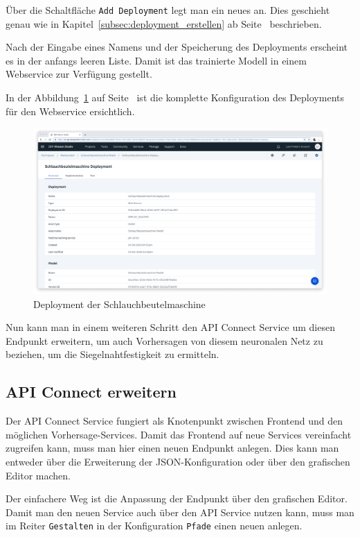 Über die Schaltfläche \texttt{Add Deployment} legt man ein neues an. Dies geschieht genau wie in
Kapitel~\ref{subsec:deployment_erstellen} ab Seite~\pageref{subsec:deployment_erstellen} beschrieben.

Nach der Eingabe eines Namens und der Speicherung des Deployments erscheint es in der anfangs leeren Liste. Damit ist
das trainierte Modell in einem Webservice zur Verfügung gestellt.

In der Abbildung~\ref{fig:siegelmaschinen_deployment} auf Seite~\pageref{fig:siegelmaschinen_deployment} ist die
komplette Konfiguration des Deployments für den Webservice ersichtlich.

\begin{figure}[h]
    \centering
    \includegraphics[width=\textwidth]{images/kapitel_5/vffs_deployment.png}
    \caption{Deployment der Schlauchbeutelmaschine}
    \label{fig:siegelmaschinen_deployment}
\end{figure}

Nun kann man in einem weiteren Schritt den API Connect Service um diesen Endpunkt erweitern, um auch Vorhersagen von
diesem neuronalen Netz zu beziehen, um die Siegelnahtfestigkeit zu ermitteln.

\subsection{API Connect erweitern}
Der API Connect Service fungiert als Knotenpunkt zwischen Frontend und den möglichen Vorhersage-Services. Damit das
Frontend auf neue Services vereinfacht zugreifen kann, muss man hier einen neuen Endpunkt anlegen. Dies kann man
entweder über die Erweiterung der JSON-Konfiguration oder über den grafischen Editor machen.

Der einfachere Weg ist die Anpassung der Endpunkt über den grafischen Editor. Damit man den neuen Service auch über den
API Service nutzen kann, muss man im Reiter \texttt{Gestalten} in der Konfiguration \texttt{Pfade} einen neuen anlegen.

